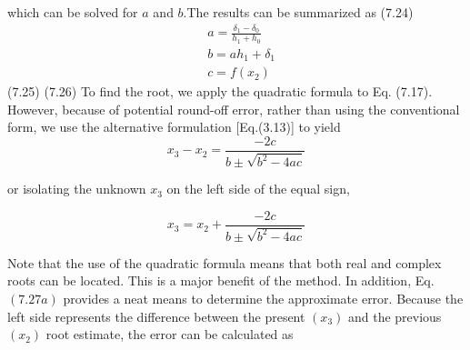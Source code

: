 which can be solved for $a$ and $b.$The results can be summarized as
(7.24)
$$\begin{aligned}&a=\frac{\delta_{1}-\delta_{0}}{h_{1}+h_{0}}\\&b=ah_{1}+\delta_{1}\\&c=f(x_{2})\end{aligned}$$
(7.25) (7.26)
To find the root, we apply the quadratic formula to Eq. (7.17). However, because of potential round-off error, rather than using the conventional form, we use the alternative formulation [Eq.(3.13)] to yield
$$x_3-x_2=\frac{-2c}{b\pm\sqrt{b^2-4ac}}$$

or isolating the unknown $x_3$ on the left side of the equal sign,

$$x_3=x_2+\frac{-2c}{b\pm\sqrt{b^2-4ac}}$$


Note that the use of the quadratic formula means that both real and complex roots can be
located. This is a major benefit of the method.
In addition, Eq. $(7.27a)$ provides a neat means to determine the approximate error. Because the left side represents the difference between the present $(x_3)$ and the previous $(x_2)$ root estimate, the error can be calculated as

